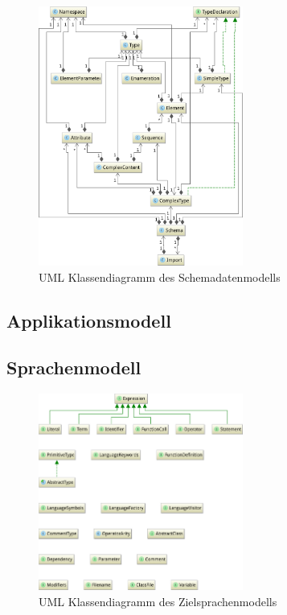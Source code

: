 \begin{figure}[tb]
    \begin{center}
        \includegraphics[width=0.6\textwidth]{resources/typemodel}
    \end{center}
    \caption{UML Klassendiagramm des Schemadatenmodells}
    \label{fig:schema_model}
\end{figure}

\subsection{Applikationsmodell}
\label{sec:application_model}

\subsection{Sprachenmodell}
\label{sec:language_model}

\begin{figure}[tb]
    \begin{center}
        \includegraphics[width=0.6\textwidth]{resources/languagemodel}
    \end{center}
    \caption{UML Klassendiagramm des Zielsprachenmodells}
    \label{fig:language_model}
\end{figure}

